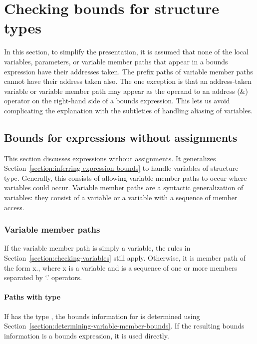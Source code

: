 
\chapter{Checking bounds for structure types}
\label{chapter:checking-structure-bounds}

In this section, to simplify the presentation, it is assumed that none
of the local variables, parameters, or variable member paths that appear
in a bounds expression have their addresses taken. The prefix paths of
variable member paths cannot have their address taken also. The one
exception is that an address-taken variable or variable member path may
appear as the operand to an address (\&) operator on the right-hand side
of a bounds expression.  This lets us avoid complicating the explanation with the subtleties of
handling aliasing of variables. 

\section{Bounds for expressions without assignments}

This section discusses expressions without assignments. It generalizes
Section~\ref{section:inferring-expression-bounds}
to handle variables of structure type. Generally, this
consists of allowing variable member paths to occur where variables
could occur. Variable member paths are a syntactic generalization of
variables: they consist of a variable or a variable with a sequence of
member access.

\subsection{Variable member paths}

If the variable member path is simply a variable, the rules in
Section~\ref{section:checking-variables}
 still apply. Otherwise, it is member path of the form
x., where x is a variable and  is a sequence of
one or more members separated by `.' operators.

\subsubsection{Paths with type \arrayptr}

If  has the type \arrayptr, the bounds information for
 is determined using 
Section~\ref{section:determining-variable-member-bounds}. If the resulting bounds
information is a bounds expression, it is used directly.

